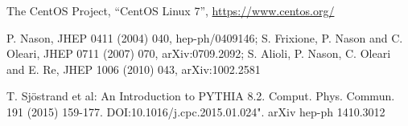 \begin{thebibliography}{}
The CentOS Project,
``CentOS Linux 7'',
\url{https://www.centos.org/}

   P. Nason, JHEP 0411 (2004) 040, hep-ph/0409146;
    S. Frixione, P. Nason and C. Oleari, JHEP 0711 (2007) 070, arXiv:0709.2092;
    S. Alioli, P. Nason, C. Oleari and E. Re, JHEP 1006 (2010) 043, arXiv:1002.2581

T. Sjöstrand et al: An Introduction to PYTHIA 8.2. Comput. Phys. Commun. 191 (2015) 159-177. DOI:10.1016/j.cpc.2015.01.024". arXiv hep-ph 1410.3012





\end{thebibliography}




